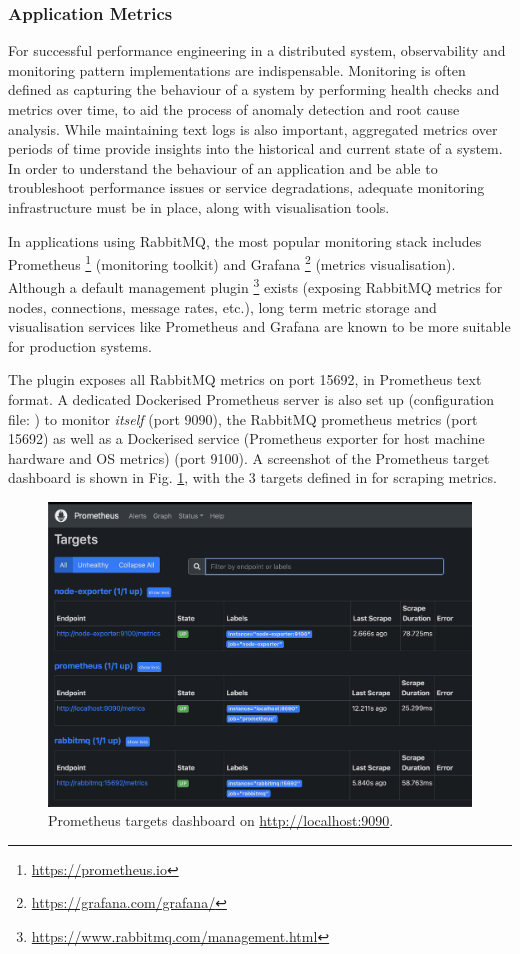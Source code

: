 \subsubsection{Application Metrics}

For successful performance engineering in a distributed system, observability and monitoring pattern implementations are indispensable. Monitoring is often defined as capturing the behaviour of a system by performing health checks and metrics over time, to aid the process of anomaly detection and root cause analysis. While maintaining text logs is also important, aggregated metrics over periods of time provide insights into the historical and current state of a system. In order to understand the behaviour of an application and be able to troubleshoot performance issues or service degradations, adequate monitoring infrastructure must be in place, along with visualisation tools.

In applications using RabbitMQ, the most popular monitoring stack includes Prometheus \footnote{\url{https://prometheus.io}} (monitoring toolkit) and Grafana \footnote{\url{https://grafana.com/grafana/}} (metrics visualisation). Although a default management plugin \footnote{\url{https://www.rabbitmq.com/management.html}} exists (exposing RabbitMQ metrics for nodes, connections, message rates, etc.), long term metric storage and visualisation services like Prometheus and Grafana are known to be more suitable for production systems.

The  plugin exposes all RabbitMQ metrics on port 15692, in Prometheus text format. A dedicated Dockerised Prometheus server is also set up (configuration file: ) to monitor \textit{itself} (port 9090), the RabbitMQ prometheus metrics (port 15692) as well as a Dockerised  service (Prometheus exporter for host machine hardware and OS metrics) (port 9100). A screenshot of the Prometheus target dashboard is shown in Fig.
\ref{fig:prom-targets}, with the 3 targets defined in  for scraping metrics.

\begin{figure}[H]
  \centering
  \includegraphics[width=0.75\linewidth]{./assets/images/case-studies/prom-targets.png}
  \caption{Prometheus targets dashboard on \url{http://localhost:9090}.}
  \label{fig:prom-targets}
\end{figure}

